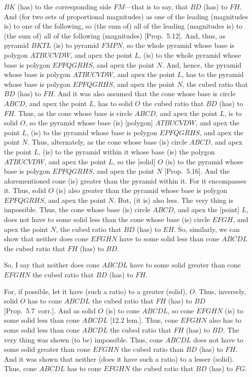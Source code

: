 \begin{Parallel}{}{}
{ $BK$ (has) to the corresponding side $FM$---that is to say, that $BD$ (has) to $FH$. And (for two sets of proportional magnitudes) as one of the leading
 (magnitudes is) to one of the following, so (the sum of) all of the leading 
 (magnitudes is) to (the sum of) all of the
 following (magnitudes) [Prop.~5.12]. And, thus, as pyramid $BKTL$ (is) to pyramid $FMPN$,
 so the whole pyramid whose base is polygon $ATBUCVDW$, and apex the point $L$, (is) to the whole pyramid
 whose base is polygon $EPFQGRHS$, and apex the point $N$. And, hence, the pyramid whose base is polygon $ATBUCVDW$, and apex the point $L$, has to the pyramid
 whose base is polygon $EPFQGRHS$, and apex the point $N$, the cubed ratio that $BD$ (has) to $FH$. And it was also assumed that the cone whose base is circle $ABCD$, and apex the point $L$, has to solid $O$ the cubed ratio that $BD$ (has)
 to $FH$. Thus, as the cone whose base is circle $ABCD$, and apex the point $L$, is to solid $O$, so the pyramid
 whose base (is) [polygon] $ATBUCVDW$, and apex the point $L$, (is) to the pyramid whose base is polygon $EPFQGRHS$, and apex the point $N$. Thus, alternately, as the cone whose base (is) circle $ABCD$, and apex the point $L$, (is)
 to the pyramid within it whose base (is) the polygon $ATBUCVDW$, and apex the point $L$, so the [solid] $O$ (is)
 to the pyramid whose base is polygon  $EPFQGRHS$, and apex the point $N$ [Prop.~5.16]. And the aforementioned cone (is)
 greater than the pyramid within it. For it encompasses it. Thus, solid $O$ (is) also greater than the pyramid whose base is polygon  $EPFQGRHS$, and apex the point $N$. But, (it is) also less. The very thing is impossible. Thus, the cone whose
 base (is) circle $ABCD$, and apex the [point] $L$, does not have to some solid less than the cone whose
 base (is) circle $EFGH$, and apex the point $N$, the cubed ratio that $BD$ (has) to $EH$.  So, similarly,
 we can show that neither does cone $EFGHN$ have to some solid less than cone $ABCDL$ the cubed
 ratio that $FH$ (has) to $BD$.
 
So, I say that neither does cone $ABCDL$ have to some solid greater than cone $EFGHN$ the cubed ratio
that $BD$ (has) to $FH$.

For, if possible, let it have (such a ratio) to a greater (solid), $O$. Thus, inversely,  solid $O$ has to
cone $ABCDL$ the cubed ratio that $FH$ (has) to $BD$ [Prop.~5.7~corr.]. 
And as solid $O$ (is) to cone $ABCDL$, so cone $EFGHN$ (is) to some solid less than cone
$ABCDL$ [12.2 lem.]. Thus, cone $EFGHN$ also has to some solid less than cone $ABCDL$ the cubed
ratio that $FH$ (has) to $BD$. The very thing was shown (to be) impossible. Thus, cone $ABCDL$
does not have to some solid greater than cone $EFGHN$ the cubed ratio than $BD$ (has) to $FH$. And
it was shown that neither (does it have such a ratio) to a lesser (solid).  Thus, cone $ABCDL$ has
to cone $EFGHN$ the cubed ratio that $BD$ (has) to $FG$.

}
\end{Parallel}
